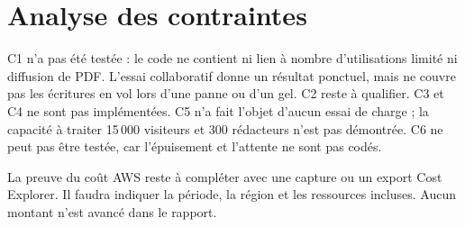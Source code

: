 \section{Analyse des contraintes}

C1 n'a pas été testée : le code ne contient ni lien à nombre d'utilisations limité ni diffusion de PDF. L'essai collaboratif donne un résultat ponctuel, mais ne couvre pas les écritures en vol lors d'une panne ou d'un gel. C2 reste à qualifier. C3 et C4 ne sont pas implémentées. C5 n'a fait l'objet d'aucun essai de charge ; la capacité à traiter 15\,000 visiteurs et 300 rédacteurs n'est pas démontrée. C6 ne peut pas être testée, car l'épuisement et l'attente ne sont pas codés.

La preuve du coût AWS reste à compléter avec une capture ou un export Cost Explorer. Il faudra indiquer la période, la région et les ressources incluses. Aucun montant n'est avancé dans le rapport.
